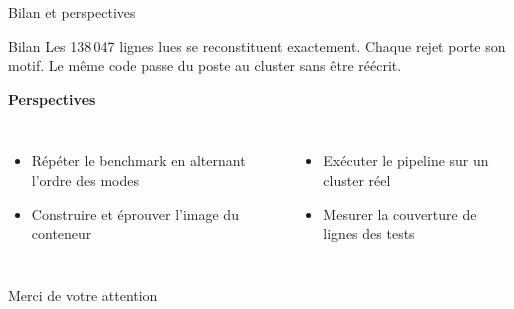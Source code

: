 \documentclass[aspectratio=169,11pt]{beamer}
\newcommand{\sanspied}{\setbeamertemplate{footline}{}}
\begin{document}
\begin{frame}{Bilan et perspectives}
  \vspace{2mm}
  \begin{block}{Bilan}
    Les 138\,047 lignes lues se reconstituent exactement. Chaque rejet porte
    son motif. Le même code passe du poste au cluster sans être réécrit.
  \end{block}

  \vspace{3mm}
  \textbf{Perspectives}
  \vspace{1mm}
  \begin{columns}[t,onlytextwidth]
      \footnotesize
      \begin{itemize}\itemsep2mm
        \item Répéter le benchmark en alternant l'ordre des modes
        \item Construire et éprouver l'image du conteneur
      \end{itemize}
      \footnotesize
      \begin{itemize}\itemsep2mm
        \item Exécuter le pipeline sur un cluster réel
        \item Mesurer la couverture de lignes des tests
      \end{itemize}
  \end{columns}

\end{frame}

\sanspied
\begin{frame}[plain]
  \vspace{2.6cm}
  \begin{center}
    {\LARGE Merci de votre attention}
  \end{center}

\end{frame}
\end{document}

